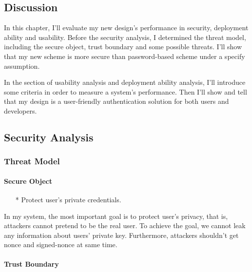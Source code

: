 \begin{CJK}{Bg5}{bsmi}


\chapter{Discussion}

In this chapter, I'll evaluate my new design's performance in security, deployment ability and usability. Before the security analysis, I determined the threat model\cite{threat-model}, including the secure object, trust boundary and some possible threats. I'll show that my new scheme is more secure than password-based scheme under a specify assumption.

In the section of usability analysis and deployment ability analysis, I'll introduce some criteria in order to measure a system's performance. Then I'll show and tell that my design is a user-friendly authentication solution for both users and developers.

\section{Security Analysis}

\subsection{Threat Model}

\subsubsection{Secure Object}

\begin{enumerate}
\item[*] Protect user's private credentials.
\end{enumerate}

In my system, the most important goal is to protect user's privacy, that is, attackers cannot pretend to be the real user. To achieve the goal, we cannot leak any information about users' private key. Furthermore, attackers shouldn't get nonce and signed-nonce at same time.

\subsubsection{Trust Boundary}


\end{CJK}

